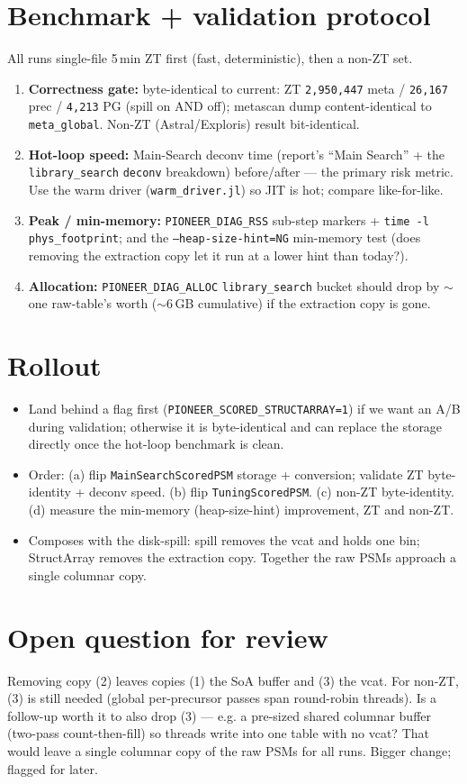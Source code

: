 \documentclass[11pt]{article}
\newcommand{\code}[1]{\texttt{\small #1}}
\begin{document}
\section{Benchmark + validation protocol}
All runs single-file 5\,min ZT first (fast, deterministic), then a non-ZT set.
\begin{enumerate}[nosep]
  \item \textbf{Correctness gate:} byte-identical to current: ZT \code{2{,}950{,}447} meta /
    \code{26{,}167} prec / \code{4{,}213} PG (spill on AND off); metascan dump content-identical
    to \code{meta\_global}. Non-ZT (Astral/Exploris) result bit-identical.
  \item \textbf{Hot-loop speed:} Main-Search deconv time (report's ``Main Search'' + the
    \code{library\_search} \code{deconv} breakdown) before/after --- the primary risk metric.
    Use the warm driver (\code{warm\_driver.jl}) so JIT is hot; compare like-for-like.
  \item \textbf{Peak / min-memory:} \code{PIONEER\_DIAG\_RSS} sub-step markers + \code{time -l}
    \code{phys\_footprint}; and the \code{--heap-size-hint=NG} min-memory test (does removing the
    extraction copy let it run at a lower hint than today?).
  \item \textbf{Allocation:} \code{PIONEER\_DIAG\_ALLOC} \code{library\_search} bucket should drop
    by \(\sim\)one raw-table's worth (\(\sim\)6\,GB cumulative) if the extraction copy is gone.
\end{enumerate}

\section{Rollout}
\begin{itemize}[nosep]
  \item Land behind a flag first (\code{PIONEER\_SCORED\_STRUCTARRAY=1}) if we want an A/B during
    validation; otherwise it is byte-identical and can replace the storage directly once the
    hot-loop benchmark is clean.
  \item Order: (a) flip \code{MainSearchScoredPSM} storage + conversion; validate ZT byte-identity
    + deconv speed. (b) flip \code{TuningScoredPSM}. (c) non-ZT byte-identity. (d) measure the
    min-memory (heap-size-hint) improvement, ZT and non-ZT.
  \item Composes with the disk-spill: spill removes the vcat and holds one bin; StructArray
    removes the extraction copy. Together the raw PSMs approach a single columnar copy.
\end{itemize}

\section{Open question for review}
Removing copy (2) leaves copies (1) the SoA buffer and (3) the vcat. For non-ZT, (3) is still
needed (global per-precursor passes span round-robin threads). Is a follow-up worth it to also
drop (3) --- e.g. a pre-sized shared columnar buffer (two-pass count-then-fill) so threads write
into one table with no vcat? That would leave a single columnar copy of the raw PSMs for all
runs. Bigger change; flagged for later.
\end{document}
